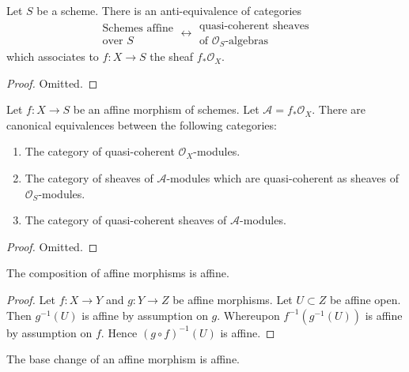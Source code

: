 \begin{lemma}
\label{lemma-affine-equivalence-algebras}
Let $S$ be a scheme. There is an anti-equivalence of categories
$$
\begin{matrix}
\text{Schemes affine} \\
\text{over }S
\end{matrix}
\longleftrightarrow
\begin{matrix}
\text{quasi-coherent sheaves} \\
\text{of }\mathcal{O}_S\text{-algebras}
\end{matrix}
$$
which associates to $f : X \to S$ the sheaf $f_*\mathcal{O}_X$.
\end{lemma}

\begin{proof}
Omitted.
\end{proof}

\begin{lemma}
\label{lemma-affine-equivalence-modules}
Let $f : X \to S$ be an affine morphism of schemes.
Let $\mathcal{A} = f_*\mathcal{O}_X$.
There are canonical equivalences between the following categories:
\begin{enumerate}
\item The category of quasi-coherent $\mathcal{O}_X$-modules.
\item The category of sheaves of $\mathcal{A}$-modules which
are quasi-coherent as sheaves of $\mathcal{O}_S$-modules.
\item The category of quasi-coherent sheaves of $\mathcal{A}$-modules.
\end{enumerate}
\end{lemma}

\begin{proof}
Omitted.
\end{proof}

\begin{lemma}
\label{lemma-composition-affine}
The composition of affine morphisms is affine.
\end{lemma}

\begin{proof}
Let $f : X \to Y$ and $g : Y \to Z$ be affine morphisms.
Let $U \subset Z$ be affine open. Then $g^{-1}(U)$ is affine
by assumption on $g$. Whereupon $f^{-1}(g^{-1}(U))$ is affine
by assumption on $f$. Hence $(g \circ f)^{-1}(U)$ is affine.
\end{proof}

\begin{lemma}
\label{lemma-base-change-affine}
The base change of an affine morphism is affine.
\end{lemma}

